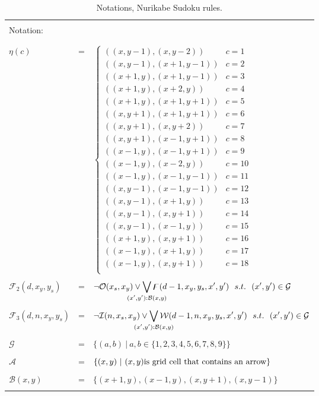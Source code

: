 \begin{table}
    \centering
    \begin{tabular*}{\textwidth}{l c l}
    \hline
    \\
    \multicolumn{3}{l}{Notation:}\\
    \\
    \hline
    \\
    $\eta(c) $   &= &$\begin{cases}
    ((x,y-1),(x,y-2))       & c = 1 \\
    ((x,y-1),(x+1,y-1))     & c = 2 \\
    ((x+1,y),(x+1,y-1))     & c = 3 \\
    ((x+1,y),(x+2,y))       & c = 4 \\
    ((x+1,y),(x+1,y+1))     & c = 5 \\
    ((x,y+1),(x+1,y+1))     & c = 6 \\
    ((x,y+1),(x,y+2))       & c = 7 \\
    ((x,y+1),(x-1,y+1))     & c = 8 \\
    ((x-1,y),(x-1,y+1))     & c = 9 \\
    ((x-1,y),(x-2,y))       & c = 10 \\
    ((x-1,y),(x-1,y-1))     & c = 11 \\
    ((x,y-1),(x-1,y-1))     & c = 12 \\
    ((x,y-1),(x+1,y))       & c = 13 \\
    ((x,y-1),(x,y+1))       & c = 14 \\
    ((x,y-1),(x-1,y))       & c = 15 \\
    ((x+1,y),(x,y+1))       & c = 16 \\
    ((x-1,y),(x+1,y))       & c = 17 \\
    ((x-1,y),(x,y+1))       & c = 18 \\
    \end{cases}$\\
    \\
    $\mathcal{F}_2(d,x_y,y_s)$          &= & $\displaystyle \neg \ocean(x_s,x_y) \lor \bigvee_{\mathclap{(x',y'):\mathcal{B}(x,y)}} \flood(d-1,x_y,y_s,x',y')~~s.t.~~(x',y') \in \mathcal{G}$\\
        \\
    $\mathcal{F}_3(d,n,x_y,y_s)$        &= & $\displaystyle \neg \island(n,x_s,x_y) \lor \bigvee_{\mathclap{(x',y'):\mathcal{B}(x,y)}} \walk(d-1,n,x_y,y_s,x',y')~~s.t.~~(x',y') \in \mathcal{G}$\\
    \\
    $\mathcal{G}$           &= & $\{(a,b)~|~a,b\in \{1,2,3,4,5,6,7,8,9\}\}$\\
    \\
    $\mathcal{A}$           &= & $\{(x,y)~|~(x,y) \textnormal{is grid cell that contains an arrow}\}$\\
    \\
    $\mathcal{B}(x,y)$      &= & $\{(x+1,y), (x-1,y), (x,y+1), (x,y-1)\}$\\
    \\
    \hline
    \end{tabular*}
    \caption{Notations, Nurikabe Sudoku rules.}
    \label{notation:NurikabeSudoku}
\end{table}

